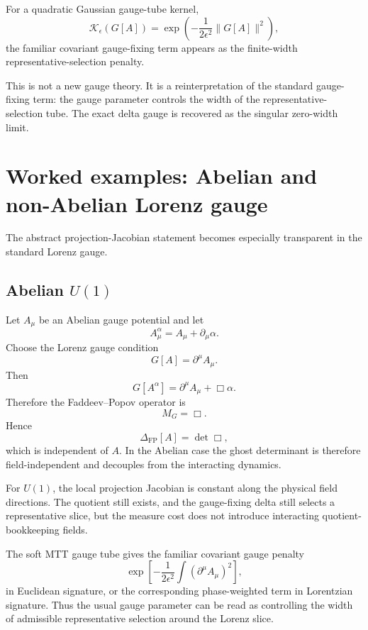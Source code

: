 \documentclass[11pt]{article}
\newcommand{\FP}{\mathrm{FP}}
\begin{document}
For a quadratic Gaussian gauge-tube kernel,
\[
\mathcal K_\epsilon(G[A])
=
\exp\left(-\frac{1}{2\epsilon^2}\|G[A]\|^2\right),
\]
the familiar covariant gauge-fixing term appears as the finite-width representative-selection penalty.

\begin{remark}
This is not a new gauge theory. It is a reinterpretation of the standard gauge-fixing term: the gauge parameter controls the width of the representative-selection tube. The exact delta gauge is recovered as the singular zero-width limit.
\end{remark}

\section{Worked examples: Abelian and non-Abelian Lorenz gauge}

The abstract projection-Jacobian statement becomes especially transparent in the standard Lorenz gauge.

\subsection{\texorpdfstring{Abelian \(U(1)\)}{Abelian U(1)}}

Let \(A_\mu\) be an Abelian gauge potential and let
\[
A_\mu^\alpha=A_\mu+\partial_\mu\alpha .
\]
Choose the Lorenz gauge condition
\[
G[A]=\partial^\mu A_\mu .
\]
Then
\[
G[A^\alpha]
=
\partial^\mu A_\mu+\Box\alpha .
\]
Therefore the Faddeev--Popov operator is
\[
M_G=\Box .
\]
Hence
\[
\Delta_{\FP}[A]=\det \Box ,
\]
which is independent of \(A\). In the Abelian case the ghost determinant is therefore field-independent and decouples from the interacting dynamics.

\begin{remark}
For \(U(1)\), the local projection Jacobian is constant along the physical field directions. The quotient still exists, and the gauge-fixing delta still selects a representative slice, but the measure cost does not introduce interacting quotient-bookkeeping fields.
\end{remark}

The soft MTT gauge tube gives the familiar covariant gauge penalty
\[
\exp\left[-\frac{1}{2\epsilon^2}\int(\partial^\mu A_\mu)^2\right],
\]
in Euclidean signature, or the corresponding phase-weighted term in Lorentzian signature. Thus the usual gauge parameter can be read as controlling the width of admissible representative selection around the Lorenz slice.
\end{document}
